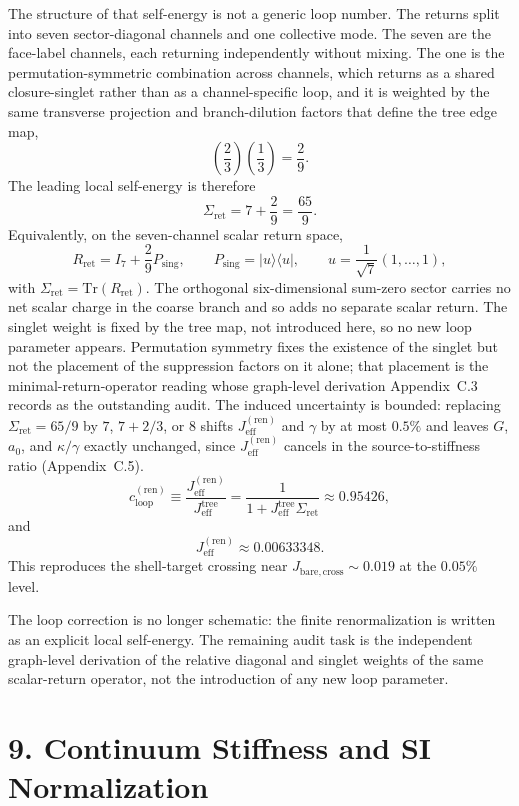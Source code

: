 \documentclass[11pt]{article}
\begin{document}
The structure of that self-energy is not a generic loop number. The returns split into seven sector-diagonal channels and one collective mode. The seven are the face-label channels, each returning independently without mixing. The one is the permutation-symmetric combination across channels, which returns as a shared closure-singlet rather than as a channel-specific loop, and it is weighted by the same transverse projection and branch-dilution factors that define the tree edge map,
\[
\left(\frac{2}{3}\right)\left(\frac{1}{3}\right)=\frac{2}{9}.
\]
The leading local self-energy is therefore
\[
\Sigma_{\mathrm{ret}}=7+\frac{2}{9}=\frac{65}{9}.
\]
Equivalently, on the seven-channel scalar return space,
\[
R_{\mathrm{ret}}=I_7+\frac{2}{9}P_{\mathrm{sing}},
\qquad
P_{\mathrm{sing}}=|u\rangle\langle u|,
\qquad
u=\frac{1}{\sqrt7}(1,\ldots,1),
\]
with $\Sigma_{\mathrm{ret}}=\mathrm{Tr}(R_{\mathrm{ret}})$. The orthogonal six-dimensional sum-zero sector carries no net scalar charge in the coarse branch and so adds no separate scalar return. The singlet weight is fixed by the tree map, not introduced here, so no new loop parameter appears. Permutation symmetry fixes the existence of the singlet but not the placement of the suppression factors on it alone; that placement is the minimal-return-operator reading whose graph-level derivation Appendix~C.3 records as the outstanding audit. The induced uncertainty is bounded: replacing $\Sigma_{\mathrm{ret}}=65/9$ by $7$, $7+2/3$, or $8$ shifts $J_{\mathrm{eff}}^{(\mathrm{ren})}$ and $\gamma$ by at most $0.5\%$ and leaves $G$, $a_0$, and $\kappa/\gamma$ exactly unchanged, since $J_{\mathrm{eff}}^{(\mathrm{ren})}$ cancels in the source-to-stiffness ratio (Appendix~C.5).
\[
c_{\mathrm{loop}}^{(\mathrm{ren})}
\equiv
\frac{J_{\mathrm{eff}}^{(\mathrm{ren})}}{J_{\mathrm{eff}}^{\mathrm{tree}}}
=
\frac{1}{1+J_{\mathrm{eff}}^{\mathrm{tree}}\Sigma_{\mathrm{ret}}}
\approx 0.95426,
\]
and
\[
J_{\mathrm{eff}}^{(\mathrm{ren})}\approx 0.00633348.
\]
This reproduces the shell-target crossing near $J_{\mathrm{bare,cross}}\sim 0.019$ at the $0.05\%$ level.

The loop correction is no longer schematic: the finite renormalization is written as an explicit local self-energy. The remaining audit task is the independent graph-level derivation of the relative diagonal and singlet weights of the same scalar-return operator, not the introduction of any new loop parameter.

\section{9. Continuum Stiffness and SI Normalization}
\end{document}
